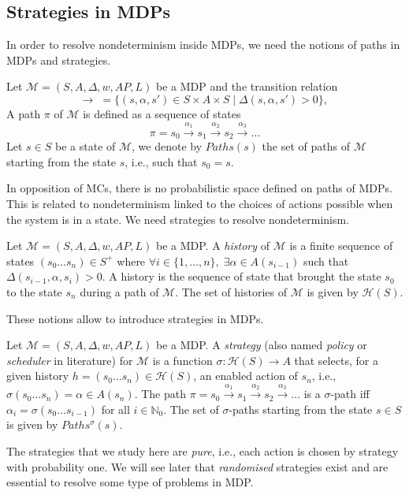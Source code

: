 \subsection{Strategies in MDPs}
In order to resolve nondeterminism inside MDPs, we need the notions of paths in MDPs and strategies.
\begin{definition}
  Let $\mathcal{M}=(S, A, \Delta, w, AP, L)$ be a MDP and the transition relation
  \[\rightarrow \; =  \{ (s, \alpha, s') \in S \times A \times S \; | \; \Delta(s, \alpha, s') > 0 \}, \,\]
	A path $\pi$ of $\mathcal{M}$ is defined as a sequence of states
	\[ \pi = s_0 \xrightarrow{\alpha_1} s_1 \xrightarrow{\alpha_2} s_2 \xrightarrow{\alpha_3} \dots \]
	Let $s \in S$ be a state of $\mathcal{M}$, we denote by $Paths(s)$ the set of
	paths of $\mathcal{M}$ starting from the state $s$, i.e., such that $s_0 = s$.
\end{definition}
In opposition of MCs, there is no probabilistic space defined on paths of MDPs.
This is related to nondeterminism linked to the choices of actions possible when the system is in a state. We need strategies to resolve nondeterminism.
\begin{definition}
	Let $\mathcal{M} = (S, A, \Delta, w, AP, L)$ be a MDP. A \textit{history} of $\mathcal{M}$
	is a finite sequence of states $(s_0 \dots s_n) \in S^+$ where
	$\forall i \in \{1, \dots, n \}, \; \exists \alpha \in A(s_{i-1})$ such that $\Delta(s_{i-1}, \alpha, s_i) > 0$.
	A history is the sequence of state that brought the state $s_0$ to the state $s_n$ during a path of $\mathcal{M}$. The set of histories of $\mathcal{M}$  is given by $\mathcal{H}(S)$.
\end{definition}

These notions allow to introduce strategies in MDPs.

\begin{definition}
Let $\mathcal{M} = (S, A, \Delta, w, AP, L)$ be a MDP. A \textit{strategy} (also named \textit{policy} or \textit{scheduler} in literature) for $\mathcal{M}$
	is a function
	$\sigma : \mathcal{H}(S) \rightarrow A$
	that selects, for a given history $h = (s_0 \dots s_n) \in \mathcal{H}(S)$, an enabled action of $s_n$, i.e., $\sigma(s_0 \dots s_n) = \alpha \in A(s_n)$.
	The path $\pi = s_0 \xrightarrow{\alpha_1} s_1 \xrightarrow{\alpha_2} s_2 \xrightarrow{\alpha_3} \dots$
	is a $\sigma$-path iff $\alpha_i = \sigma(s_0 \dots s_{i-1})$
	for all $i \in \mathbb{N}_0$. The set of $\sigma$-paths starting from the state $s \in S$ is given by $Paths^\sigma(s)$.
\end{definition}
The strategies that we study here are \textit{pure}, i.e., each action is chosen by strategy with probability one. We will see later that \textit{randomised} strategies exist and are essential to resolve some type of problems in MDP. \\

